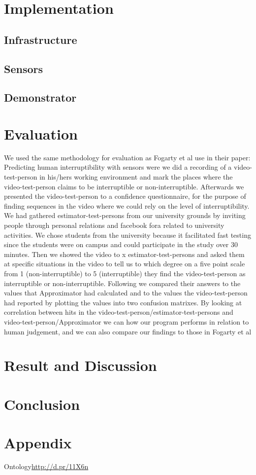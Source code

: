 \documentclass{sigchi}
\begin{document}
\section{Implementation}

\subsection{Infrastructure}
\subsection{Sensors}
\subsection{Demonstrator}

\section{Evaluation}
We used the same methodology for evaluation as Fogarty et al use in their paper: Predicting human interruptibility with sensors\cite{Fogarty:2005:PHI:1057237.1057243} were we did a recording of a video-test-person in his/hers working environment and mark the places where the video-test-person claims to be interruptible or non-interruptible. Afterwards we presented the video-test-person to a confidence questionnaire, for the purpose of finding sequences in the video where we could rely on the level of interruptibility.
We had gathered estimator-test-persons from our university grounds by inviting people through personal relations and facebook fora related to university activities.
We chose students from the university because it facilitated fast testing since the students were on campus and could participate in the study over 30 minutes.
Then we showed the video to x estimator-test-persons and asked them at specific situations in the video to tell us to which degree on a five point scale from 1 (non-interruptible) to 5 (interruptible) they find the video-test-person as interruptible or non-interruptible.
Following we compared their answers to the values that Approximator had calculated and to the values the video-test-person had reported by plotting the values into two confusion matrixes.
By looking at correlation between hits in the video-test-person/estimator-test-persons and video-test-person/Approximator we can how our program performs in relation to human judgement, and we can also compare our findings to those in Fogarty et al \cite{Fogarty:2005:PHI:1057237.1057243}


\section{Result and Discussion}

\section{Conclusion}

\balance



\section{Appendix}
Ontology\url{http://d.pr/11X6n}
\end{document}
